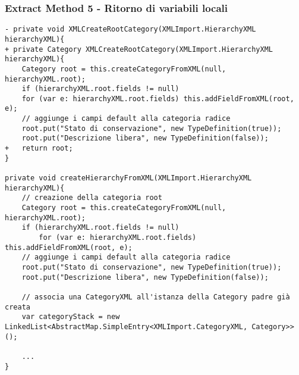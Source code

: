 \disablefooter%
\begin{frame}[fragile]
    \frametitle{Extract Method 5 - Ritorno di variabili locali}
    \begin{lstlisting}[language=tiny_diff]
- private void XMLCreateRootCategory(XMLImport.HierarchyXML hierarchyXML){
+ private Category XMLCreateRootCategory(XMLImport.HierarchyXML hierarchyXML){
    Category root = this.createCategoryFromXML(null, hierarchyXML.root);
    if (hierarchyXML.root.fields != null)
    for (var e: hierarchyXML.root.fields) this.addFieldFromXML(root, e);
    // aggiunge i campi default alla categoria radice
    root.put("Stato di conservazione", new TypeDefinition(true));
    root.put("Descrizione libera", new TypeDefinition(false));
+   return root;
}

private void createHierarchyFromXML(XMLImport.HierarchyXML hierarchyXML){
    // creazione della categoria root
    Category root = this.createCategoryFromXML(null, hierarchyXML.root);
    if (hierarchyXML.root.fields != null)
        for (var e: hierarchyXML.root.fields) this.addFieldFromXML(root, e);
    // aggiunge i campi default alla categoria radice
    root.put("Stato di conservazione", new TypeDefinition(true));
    root.put("Descrizione libera", new TypeDefinition(false));

    // associa una CategoryXML all'istanza della Category padre già creata
    var categoryStack = new LinkedList<AbstractMap.SimpleEntry<XMLImport.CategoryXML, Category>>();

    ...
}
\end{lstlisting}
\end{frame}
\enablefooter%

